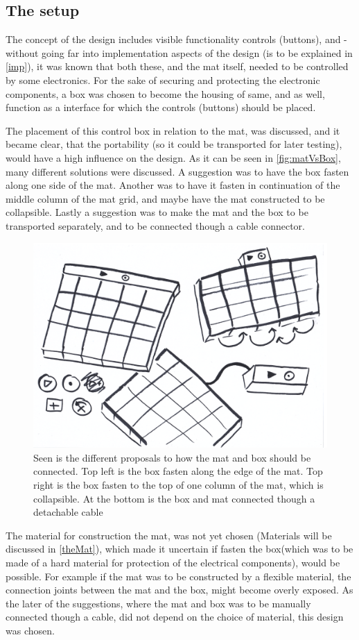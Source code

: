 \subsection{The setup}
The concept of the design includes visible functionality controls (buttons), and - without going far into implementation aspects of the design (is to be explained in \autoref{imp}), it was known that both these, and the mat itself, needed to be controlled by some electronics. For the sake of securing and protecting the electronic components, a box was chosen to become the housing of same, and as well, function as a interface for which the controls (buttons) should be placed. 

The placement of this control box in relation to the mat, was discussed, and it became clear, that the portability (so it could be transported for later testing), would have a high influence on the design. As it can be seen in \autoref{fig:matVsBox}, many different solutions were discussed. A suggestion was to have the box fasten along one side of the mat. Another was to have it fasten in continuation of the middle column of the mat grid, and maybe have the mat constructed to be collapsible. Lastly a suggestion was to make the mat and the box to be transported separately, and to be connected though a cable connector.     

\begin{figure}[H]
	\centering
	\includegraphics[width=0.7\linewidth]{figure/Design/maatteSetup}
	\caption{Seen is the different proposals to how the mat and box should be connected. Top left is the box fasten along the edge of the mat. Top right is the box fasten to the top of one column of the mat, which is collapsible. At the bottom is the box and mat connected though a detachable cable}
	\label{fig:matVsBox}
\end{figure} 

The material for construction the mat, was not yet chosen (Materials will be discussed in \autoref{theMat}), which made it uncertain if fasten the box(which was to be made of a hard material for protection of the electrical components), would be possible. For example if the mat was to be constructed by a flexible material, the connection joints between the mat and the box, might become overly exposed.
As the later of the suggestions, where the mat and box was to be manually connected though a cable, did not depend on the choice of material, this design was chosen. 


